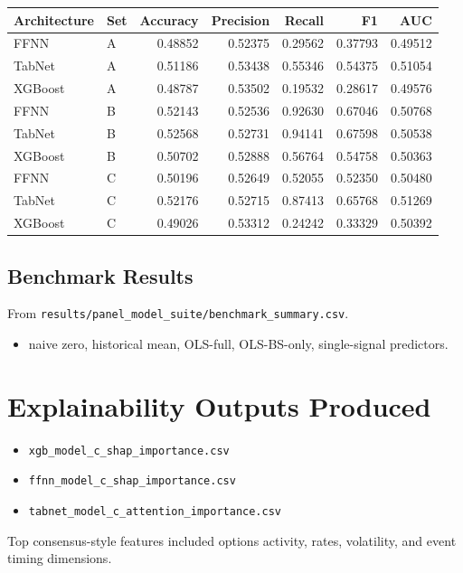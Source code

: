 \documentclass[11pt]{article}
\begin{document}
\begin{footnotesize}
\begin{longtable}{l l r r r r r}
\toprule
Architecture & Set & Accuracy & Precision & Recall & F1 & AUC \\
\midrule
\endhead
FFNN & A & 0.48852 & 0.52375 & 0.29562 & 0.37793 & 0.49512 \\
TabNet & A & 0.51186 & 0.53438 & 0.55346 & 0.54375 & 0.51054 \\
XGBoost & A & 0.48787 & 0.53502 & 0.19532 & 0.28617 & 0.49576 \\
FFNN & B & 0.52143 & 0.52536 & 0.92630 & 0.67046 & 0.50768 \\
TabNet & B & 0.52568 & 0.52731 & 0.94141 & 0.67598 & 0.50538 \\
XGBoost & B & 0.50702 & 0.52888 & 0.56764 & 0.54758 & 0.50363 \\
FFNN & C & 0.50196 & 0.52649 & 0.52055 & 0.52350 & 0.50480 \\
TabNet & C & 0.52176 & 0.52715 & 0.87413 & 0.65768 & 0.51269 \\
XGBoost & C & 0.49026 & 0.53312 & 0.24242 & 0.33329 & 0.50392 \\
\bottomrule
\end{longtable}
\end{footnotesize}

\subsection{Benchmark Results}
From \texttt{results/panel\_model\_suite/benchmark\_summary.csv}.
\begin{itemize}[leftmargin=1.2em]
  \item naive zero, historical mean, OLS-full, OLS-BS-only, single-signal predictors.
\end{itemize}

\section{Explainability Outputs Produced}
\begin{itemize}[leftmargin=1.2em]
  \item \texttt{xgb\_model\_c\_shap\_importance.csv}
  \item \texttt{ffnn\_model\_c\_shap\_importance.csv}
  \item \texttt{tabnet\_model\_c\_attention\_importance.csv}
\end{itemize}
Top consensus-style features included options activity, rates, volatility, and event timing dimensions.
\end{document}
